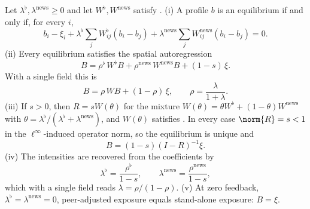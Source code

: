 \begin{proposition}\label{prop:peer-adjustment}
  \label{thm:adjustment-equilibrium}\label{thm:spatial-closure}
  \label{thm:two-field-closure}\label{cor:mixture-nesting}
  \label{thm:sar-reduced-form}\label{prop:channel-inversion}
  \label{cor:zero-feedback-nesting}
  Let $\lambda^\flat,\lambda^{\mathrm{news}}\geq0$ and let
  $W^\flat,W^{\mathrm{news}}$ satisfy
  .
  (i) A profile $b$ is an equilibrium if and only if, for every $i$,
  \begin{equation}\label{eq:adjustment-stationarity}
    b_i-\xi_i+\lambda^\flat\sum_j W^\flat_{ij}(b_i-b_j)
    +\lambda^{\mathrm{news}}\sum_j W^{\mathrm{news}}_{ij}(b_i-b_j)=0 .
  \end{equation}
  (ii) Every equilibrium satisfies the spatial autoregression
  \begin{equation}\label{eq:two-field-sar}
    B=\rho^\flat\,W^\flat B+\rho^{\mathrm{news}}\,W^{\mathrm{news}}B+(1-s)\,\xi .
  \end{equation}
  With a single field this is
  \begin{equation}\label{eq:hilbert-sar}
    B=\rho\,WB+(1-\rho)\,\xi,
    \qquad
    \rho=\frac{\lambda}{1+\lambda}.
  \end{equation}
  (iii) If $s>0$, then $R=sW(\theta)$ for the mixture
  $W(\theta)=\theta W^\flat+(1-\theta)W^{\mathrm{news}}$ with
  $\theta=\lambda^\flat/(\lambda^\flat+\lambda^{\mathrm{news}})$, and
  $W(\theta)$ satisfies
  .
  In every case $\norm{R}=s<1$ in the $\ell^\infty$-induced operator norm,
  so the equilibrium is unique and
  \begin{equation}\label{eq:hilbert-reduced-form}
    B=(1-s)(I-R)^{-1}\xi .
  \end{equation}
  (iv) The intensities are recovered from the coefficients by
  \begin{equation}\label{eq:channel-inversion}
    \lambda^\flat=\frac{\rho^\flat}{1-s},
    \qquad
    \lambda^{\mathrm{news}}=\frac{\rho^{\mathrm{news}}}{1-s},
  \end{equation}
  which with a single field reads $\lambda=\rho/(1-\rho)$.
  (v) At zero feedback, $\lambda^\flat=\lambda^{\mathrm{news}}=0$,
  peer-adjusted exposure
  equals stand-alone exposure: $B=\xi$.
\end{proposition}

